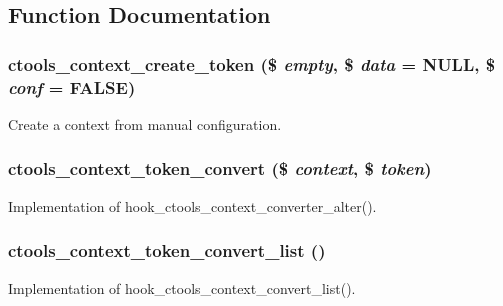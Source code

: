 \subsection{Function Documentation}
\hypertarget{contexts_2token_8inc_ab8eb1d3d654f1fde3224dc0d963d381c}{
\subsubsection[{ctools\_\-context\_\-create\_\-token}]{\setlength{\rightskip}{0pt plus 5cm}ctools\_\-context\_\-create\_\-token (\$ {\em empty}, \/  \$ {\em data} = {\ttfamily NULL}, \/  \$ {\em conf} = {\ttfamily FALSE})}}
\label{contexts_2token_8inc_ab8eb1d3d654f1fde3224dc0d963d381c}
Create a context from manual configuration. \hypertarget{contexts_2token_8inc_ab50aa70da250bffd56e1948218a6b3c8}{
\subsubsection[{ctools\_\-context\_\-token\_\-convert}]{\setlength{\rightskip}{0pt plus 5cm}ctools\_\-context\_\-token\_\-convert (\$ {\em context}, \/  \$ {\em token})}}
\label{contexts_2token_8inc_ab50aa70da250bffd56e1948218a6b3c8}
Implementation of hook\_\-ctools\_\-context\_\-converter\_\-alter(). \hypertarget{contexts_2token_8inc_a7a253406a63a33265393b3468539a6f7}{
\subsubsection[{ctools\_\-context\_\-token\_\-convert\_\-list}]{\setlength{\rightskip}{0pt plus 5cm}ctools\_\-context\_\-token\_\-convert\_\-list ()}}
\label{contexts_2token_8inc_a7a253406a63a33265393b3468539a6f7}
Implementation of hook\_\-ctools\_\-context\_\-convert\_\-list(). 

